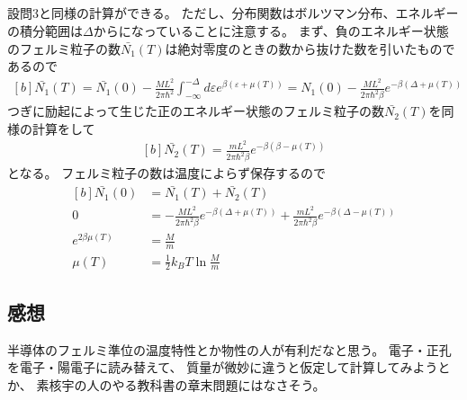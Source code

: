 \documentclass[../../master.tex]{subfiles}
\begin{document}
\subsection{}
設問3と同様の計算ができる。
ただし、分布関数はボルツマン分布、エネルギーの積分範囲は\(\Delta\)からになっていることに注意する。
まず、負のエネルギー状態のフェルミ粒子の数\(\bar{N_1}(T)\)は絶対零度のときの数から抜けた数を引いたものであるので
\begin{equation}\begin{aligned}[b]
    \bar{N_1}(T) = \bar{N_1}(0)-\frac{ML^2}{2\pi\hbar^2}\int_{-\infty}^{-\Delta}d\varepsilon e^{\beta(\varepsilon+\mu(T))}
    =N_1(0)-\frac{ML^2}{2\pi\hbar^2\beta}e^{-\beta(\Delta+\mu(T))}
\end{aligned}\end{equation}
つぎに励起によって生じた正のエネルギー状態のフェルミ粒子の数\(\bar{N_2}(T)\)を同様の計算をして
\begin{equation}\begin{aligned}[b]
    \bar{N_2}(T) = \frac{mL^2}{2\pi\hbar^2 \beta}e^{-\beta(\beta-\mu(T))}
\end{aligned}\end{equation}
となる。
フェルミ粒子の数は温度によらず保存するので
\begin{equation}\begin{aligned}[b]
    \bar{N_1}(0) &= \bar{N_1}(T)+\bar{N_2}(T)\\
    0 &= -\frac{ML^2}{2\pi\hbar^2\beta}e^{-\beta(\Delta+\mu(T))}+\frac{mL^2}{2\pi\hbar^2\beta}e^{-\beta(\Delta-\mu(T))}\\
    e^{2\beta\mu(T)} &= \frac{M}{m}\\
    \mu(T) &= \frac{1}{2}k_BT\ln\frac{M}{m}
\end{aligned}\end{equation}


\subsection*{感想}
半導体のフェルミ準位の温度特性とか物性の人が有利だなと思う。
電子・正孔を電子・陽電子に読み替えて、
質量が微妙に違うと仮定して計算してみようとか、
素核宇の人のやる教科書の章末問題にはなさそう。
\end{document}

